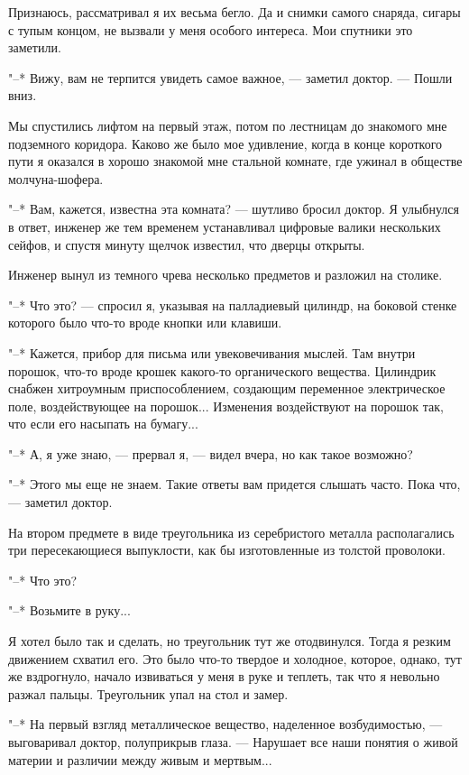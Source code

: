 Признаюсь, рассматривал я их весьма бегло. Да и снимки самого  снаряда,
сигары с тупым концом, не вызвали у меня особого  интереса.  Мои  спутники
это заметили.

"--* Вижу, вам не терпится увидеть самое важное, --- заметил доктор. --- Пошли
вниз.

Мы спустились лифтом на первый этаж, потом по  лестницам  до  знакомого
мне подземного коридора. Каково же  было  мое  удивление,  когда  в  конце
короткого пути я оказался в хорошо  знакомой  мне  стальной  комнате,  где
ужинал в обществе молчуна-шофера.

"--* Вам, кажется, известна  эта  комната?  ---  шутливо  бросил  доктор.  Я
улыбнулся в ответ, инженер же тем временем  устанавливал  цифровые  валики
нескольких сейфов, и спустя минуту щелчок известил, что дверцы открыты.

Инженер вынул из  темного  чрева  несколько  предметов  и  разложил  на
столике.

"--* Что это? --- спросил я, указывая на  палладиевый  цилиндр,  на  боковой
стенке которого было что-то вроде кнопки или клавиши.

"--* Кажется, прибор для письма  или  увековечивания  мыслей.  Там  внутри
порошок, что-то вроде крошек какого-то органического  вещества.  Цилиндрик
снабжен хитроумным  приспособлением,  создающим  переменное  электрическое
поле, воздействующее на порошок... Изменения воздействуют на порошок  так,
что если его насыпать на бумагу...

"--* А, я уже знаю, --- прервал я, --- видел вчера, но как такое возможно?

"--* Этого мы еще не знаем. Такие ответы вам придется слышать часто.  Пока
что, --- заметил доктор.

На  втором  предмете  в  виде  треугольника  из  серебристого   металла
располагались три  пересекающиеся  выпуклости,  как  бы  изготовленные  из
толстой проволоки.

"--* Что это?

"--* Возьмите в руку...

Я хотел было так и сделать, но треугольник тут же отодвинулся. Тогда  я
резким движением схватил его. Это было что-то твердое и холодное, которое,
однако, тут же вздрогнуло, начало извиваться у меня в руке и теплеть,  так
что я невольно разжал пальцы. Треугольник упал на стол и замер.

"--* На первый взгляд металлическое вещество, наделенное возбудимостью,  ---
выговаривал доктор, полуприкрыв глаза. --- Нарушает все наши понятия о живой
материи и различии между живым и мертвым...

